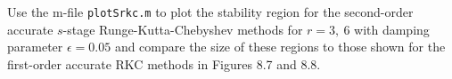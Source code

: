 

Use the m-file {\tt plotSrkc.m} to plot the stability region for the
second-order accurate $s$-stage Runge-Kutta-Chebyshev methods for $r=3,~6$
with damping parameter $\epsilon = 0.05$ and compare the size of these
regions to those shown for the first-order accurate RKC methods in Figures
8.7 and 8.8.

